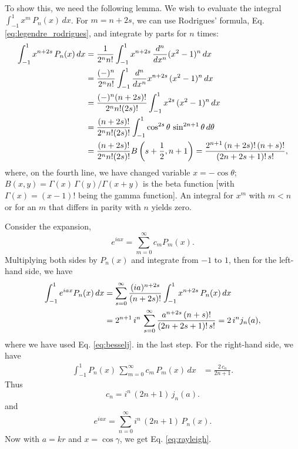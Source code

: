 \documentclass[11pt]{article}
\begin{document}
To show this, we need the following lemma.
%
We wish to evaluate the integral
$\int_{-1}^1 x^m \, P_n(x) \, dx$.
%
For $m = n + 2 s$, we can use
Rodrigues' formula, Eq. \eqref{eq:legendre_rodrigues},
and integrate by parts for $n$ times:
\begin{align*}
\int_{-1}^1 x^{n + 2s} \, P_n(x) \, dx
&=
\frac{ 1 } { 2^n n! }
\int_{-1}^1 x^{n + 2 s} \,
\frac{d^n}{dx^n} (x^2 - 1)^n \, dx
\notag \\
&=
\frac{ (-)^n } { 2^n n! }
\int_{-1}^1 \frac{d^n}{dx^n} x^{n + 2 s} \,
(x^2 - 1)^n \, dx
\notag \\
&=
\frac{ (-)^n (n + 2 s)! } { 2^n n! (2 s)! }
\int_{-1}^1 x^{2 s} \,
(x^2 - 1)^n \, dx
\notag \\
&=
\frac{ (n + 2 s)! } { 2^n n! (2 s)! }
\int_{-1}^1 \cos^{2 s}\theta \,
\sin^{2n + 1}\theta \, d\theta
\notag \\
&=
\frac{ (n + 2 s)! } { 2^n n! (2 s)! }
B\left(s + \frac{1}{2}, n + 1\right)
=
\frac{ 2^{n+1} \, (n + 2 s)! \, (n + s)! } { (2 n + 2 s + 1)! \, s! },
\notag \\
\end{align*}
where,
on the fourth line,
we have changed variable $x = -\cos\theta$;
%
$B(x, y) = \Gamma(x) \, \Gamma(y) / \Gamma(x + y)$
is the beta function
[with $\Gamma(x) = (x-1)!$ being the gamma function].
%
An integral for $x^m$ with $m < n$
or for an $m$ that differs in parity with $n$
yields zero.


Consider the expansion,
\[
  e^{iax} = \sum_{m = 0}^\infty c_m P_m(x).
\]
Multiplying both sides by $P_n(x)$ and integrate from $-1$ to $1$,
then for the left-hand side, we have
\begin{align}
  \int_{-1}^1
  e^{iax} P_n(x) \, dx
&=
  \sum_{s = 0}^\infty
  \frac{ (ia)^{n + 2s} } { (n + 2s)! }
  \int_{-1}^1
  x^{n + 2 s} \, P_n(x) \, dx
  \notag \\
&=
  2^{n+1} \, i^n \,
  \sum_{s = 0}^\infty
  \frac{ a^{n + 2s} \, (n + s)! }
  { (2n + 2s + 1)! \, s! }
= 2 \, i^n j_n(a),
\label{eq:PnFT}
\end{align}
where we have used Eq. \eqref{eq:besselj}.
in the last step.
For the right-hand side, we have
\begin{align*}
  \int_{-1}^1 P_n(x) \, \sum_{m = 0}^\infty c_m \, P_m(x) \, dx
&=
  \frac{ 2 \, c_n } { 2 n + 1}.
\end{align*}
%
Thus
\[
  c_n = i^n \, (2 n + 1) \, j_n(a).
\]
and
\[
  e^{iax} = \sum_{n = 0}^\infty i^n \, (2 n + 1) \, P_n(x).
\]
Now with $a = kr$ and $x = \cos\gamma$, we get Eq. \eqref{eq:rayleigh}.
\end{document}
